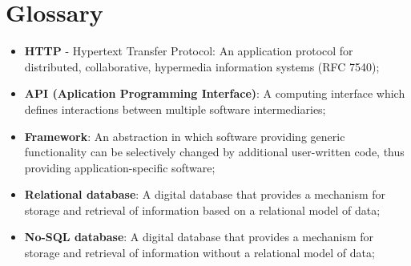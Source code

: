 \chapter*{Glossary}

\begin{itemize}
    \item \textbf{HTTP} - Hypertext Transfer Protocol: An application protocol for distributed,
     collaborative, hypermedia information systems (RFC 7540);
    \item \textbf{API (Aplication Programming Interface)}: A computing interface which defines
     interactions between multiple software intermediaries;
    \item \textbf{Framework}: An abstraction in which software providing generic functionality can
     be selectively changed by additional user-written code,
     thus providing application-specific software;
     \item \textbf{Relational database}: A digital database that provides a mechanism for storage and
     retrieval of information based on a relational model of data;
     \item \textbf{No-SQL database}: A digital database that provides a mechanism for storage and
     retrieval of information without a relational model of data;
\end{itemize}